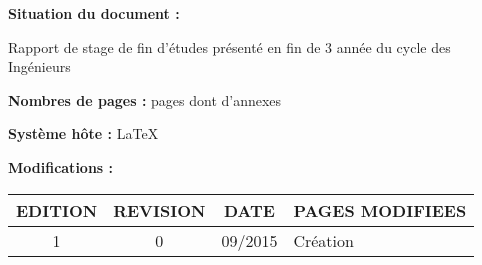 \textbf{Situation du document :} 
\vspace{0.2cm}
\par
Rapport de stage de fin d'études présenté en fin de 3 année du cycle des Ingénieurs
\vspace{0.3cm}



\textbf{Nombres de pages :}  pages dont  d'annexes
\vspace{0.3cm}

\textbf{Système hôte :} \LaTeX
\vspace{1cm}


\textbf{Modifications :} 
\begin{center}
\begin{tabular}{|c|c|c|>{\centering}p{6.5cm}|}
\hline 
EDITION & REVISION & DATE & PAGES MODIFIEES\tabularnewline
\hline
\hline 
1 & 0 & 09/2015 & Création\tabularnewline
\hline 

\end{tabular}
\end{center}